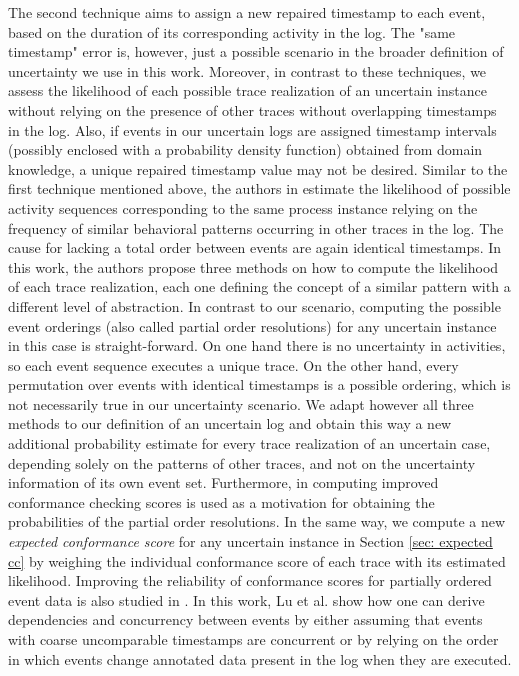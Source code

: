 The second technique aims to assign a new repaired timestamp to each event, based on the duration of its corresponding activity in the log.
The "same timestamp" error is, however, just a possible scenario in the broader definition of uncertainty we use in this work.
Moreover, in contrast to these techniques, we assess the likelihood of each possible trace realization of an uncertain instance without relying on the presence of other traces without overlapping timestamps in the log.
Also, if events in our uncertain logs are assigned timestamp intervals (possibly enclosed with a probability density function) obtained from domain knowledge, a unique repaired timestamp value may not be desired.
Similar to the first technique mentioned above, the authors in \cite{por} estimate the likelihood of possible activity sequences corresponding to the same process instance relying on the frequency of similar behavioral patterns occurring in other traces in the log.
The cause for lacking a total order between events are again identical timestamps.
In this work, the authors propose three methods on how to compute the likelihood of each trace realization, each one defining the concept of a similar pattern with a different level of abstraction.
In contrast to our scenario, computing the possible event orderings (also called partial order resolutions) for any uncertain instance in this case is straight-forward.
On one hand there is no uncertainty in activities, so each event sequence executes a unique trace.
On the other hand, every permutation over events with identical timestamps is a possible ordering, which is not necessarily true in our uncertainty scenario.
We adapt however all three methods to our definition of an uncertain log and obtain this way a new additional probability estimate for every trace realization of an uncertain case, depending solely on the patterns of other traces, and not on the uncertainty information of its own event set.
Furthermore, in \cite{por} computing improved conformance checking scores is used as a motivation for obtaining the probabilities of the partial order resolutions.
In the same way, we compute a new \textit{expected conformance score} for any uncertain instance in Section \ref{sec: expected cc} by weighing the individual conformance score of each trace with its estimated likelihood.
Improving the reliability of conformance scores for partially ordered event data is also studied in \cite{xixi}.
In this work, Lu et al. show how one can derive dependencies and concurrency between events by either assuming that events with coarse uncomparable timestamps are concurrent or by relying on the order in which events change annotated data present in the log when they are executed.
